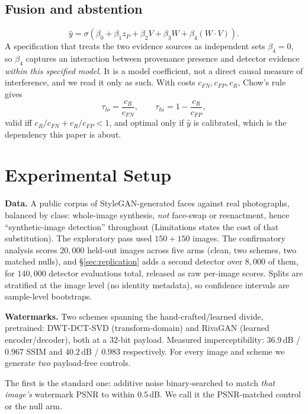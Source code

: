 \documentclass[journal]{IEEEtran}
\begin{document}
\subsection{Fusion and abstention}
\begin{equation}
  \hat{y} = \sigma\!\left(\beta_0 + \beta_1 z_P + \beta_2 V + \beta_3 W
            + \beta_4 (W\!\cdot\!V)\right).
  \label{eq:fusion}
\end{equation}
A specification that treats the two evidence sources as independent sets
$\beta_4 = 0$, so $\beta_4$ captures an interaction between provenance
presence and detector evidence \emph{within this specified model}. It is a
model coefficient, not a direct causal measure of interference, and we read
it only as such. With costs
$c_{FN}, c_{FP}, c_R$, Chow's rule~\cite{chow1970reject} gives
\begin{equation}
  \tau_{lo} = \frac{c_R}{c_{FN}}, \qquad
  \tau_{hi} = 1 - \frac{c_R}{c_{FP}},
  \label{eq:chow}
\end{equation}
valid iff $c_R/c_{FN} + c_R/c_{FP} < 1$, and optimal only if $\hat{y}$ is
calibrated, which is the dependency this paper is about.

\section{Experimental Setup}
\label{sec:setup}

\textbf{Data.} A public corpus of StyleGAN-generated faces against real
photographs, balanced by class: whole-image synthesis, \emph{not} face-swap or
reenactment, hence ``synthetic-image detection'' throughout (Limitations
states the cost of that substitution). The exploratory pass used $150{+}150$
images. The confirmatory analysis scores $20{,}000$ held-out images across
five arms (clean, two schemes, two matched nulls), and \S\ref{sec:replication}
adds a second detector over $8{,}000$ of them, for $140{,}000$ detector
evaluations total, released as raw per-image scores. Splits are stratified at
the image level (no identity metadata), so confidence intervals are
sample-level bootstraps.

\textbf{Watermarks.} Two schemes spanning the hand-crafted/learned divide,
pretrained: DWT-DCT-SVD (transform-domain) and RivaGAN (learned
encoder/decoder), both at a $32$-bit payload. Measured imperceptibility:
$36.9$\,dB / $0.967$ SSIM and $40.2$\,dB / $0.983$ respectively. For every
image and scheme we generate \emph{two} payload-free controls.

The first is the standard one: additive noise binary-searched to match
\emph{that image's} watermark PSNR to within $0.5$\,dB. We call it the
PSNR-matched control or the null arm.
\end{document}
